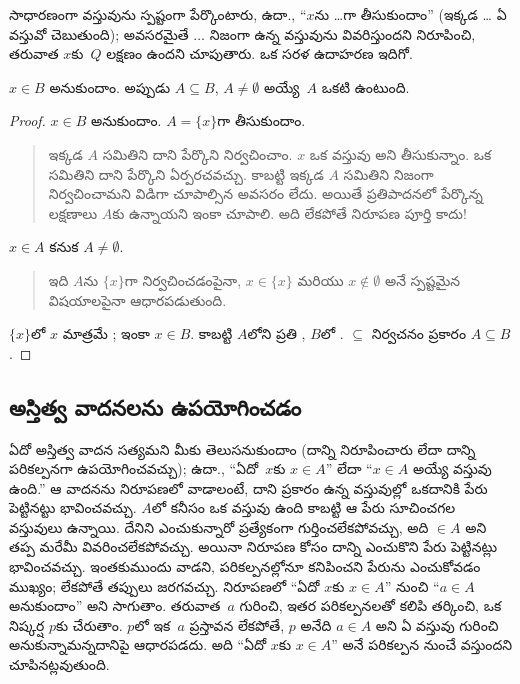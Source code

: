 \documentclass[../../../include/open-logic-section]{subfiles}
\begin{document}
సాధారణంగా వస్తువును స్పష్టంగా పేర్కొంటారు, ఉదా., ``$x$ను \dots గా తీసుకుందాం'' (ఇక్కడ \dots{} ఏ వస్తువో చెబుతుంది); అవసరమైతే $\dots$ నిజంగా ఉన్న వస్తువును వివరిస్తుందని నిరూపించి, తరువాత $x$కు~$Q$ లక్షణం ఉందని చూపుతారు. ఒక సరళ ఉదాహరణ ఇదిగో.

\begin{prop}
  $x \in B$ అనుకుందాం. అప్పుడు $A \subseteq
  B$, $A \neq \emptyset$ అయ్యే~$A$ ఒకటి ఉంటుంది.
\end{prop}

\begin{proof}
  $x \in B$ అనుకుందాం. $A = \{x\}$గా తీసుకుందాం.
  \begin{quote}
    ఇక్కడ $A$ సమితిని దాని  పేర్కొని నిర్వచించాం. $x$ ఒక వస్తువు అని తీసుకున్నాం. ఒక సమితిని దాని  పేర్కొని ఏర్పరచవచ్చు. కాబట్టి ఇక్కడ $A$ సమితిని నిజంగా నిర్వచించామని విడిగా చూపాల్సిన అవసరం లేదు. అయితే ప్రతిపాదనలో పేర్కొన్న లక్షణాలు $A$కు ఉన్నాయని ఇంకా చూపాలి. అది లేకపోతే నిరూపణ పూర్తి కాదు!{}
  \end{quote}
  $x \in A$ కనుక $A \neq \emptyset$.
  \begin{quote}
    ఇది $A$ను $\{x\}$గా నిర్వచించడంపైనా, $x \in \{x\}$ మరియు $x \notin \emptyset$ అనే స్పష్టమైన విషయాలపైనా ఆధారపడుతుంది.
  \end{quote}
  $\{x\}$లో $x$ మాత్రమే ; ఇంకా $x \in B$. కాబట్టి $A$లోని ప్రతి , $B$లో . $\subseteq$ నిర్వచనం ప్రకారం $A \subseteq B$.
\end{proof}

\subsection{అస్తిత్వ వాదనలను ఉపయోగించడం}

ఏదో అస్తిత్వ వాదన సత్యమని మీకు తెలుసనుకుందాం (దాన్ని నిరూపించారు లేదా దాన్ని పరికల్పనగా ఉపయోగించవచ్చు); ఉదా., ``ఏదో~$x$కు $x \in A$'' లేదా ``$x \in A$ అయ్యే వస్తువు ఉంది.'' ఆ వాదనను నిరూపణలో వాడాలంటే, దాని ప్రకారం ఉన్న వస్తువుల్లో ఒకదానికి పేరు పెట్టినట్టు భావించవచ్చు. $A$లో కనీసం ఒక వస్తువు ఉంది కాబట్టి ఆ పేరు సూచించగల వస్తువులు ఉన్నాయి. దేనిని ఎంచుకున్నారో ప్రత్యేకంగా గుర్తించలేకపోవచ్చు, అది $\in A$ అని తప్ప మరేమీ వివరించలేకపోవచ్చు. అయినా నిరూపణ కోసం దాన్ని ఎంచుకొని పేరు పెట్టినట్లు భావించవచ్చు. ఇంతకుముందు వాడని, పరికల్పనల్లోనూ కనిపించని పేరును ఎంచుకోవడం ముఖ్యం; లేకపోతే తప్పులు జరగవచ్చు. నిరూపణలో ``ఏదో $x$కు $x \in A$'' నుంచి ``$a
\in A$ అనుకుందాం'' అని సాగుతాం. తరువాత~$a$ గురించి, ఇతర పరికల్పనలతో కలిపి తర్కించి, ఒక నిష్కర్ష $p$కు చేరుతాం. $p$లో ఇక~$a$ ప్రస్తావన లేకపోతే, $p$ అనేది $a \in A$ అని ఏ వస్తువు గురించి అనుకున్నామన్నదానిపై ఆధారపడదు. అది ``ఏదో $x$కు $x \in A$'' అనే పరికల్పన నుంచే వస్తుందని చూపినట్లవుతుంది.
\end{document}
